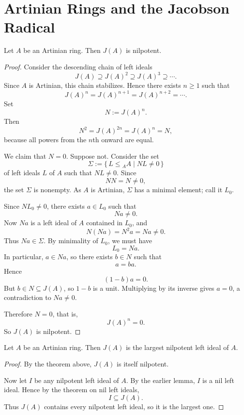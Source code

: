 \section{Artinian Rings and the Jacobson Radical}

\begin{theorem}
    Let $A$ be an Artinian ring. Then $J(A)$ is nilpotent.
\end{theorem}

\begin{proof}
    Consider the descending chain of left ideals
    \[
        J(A)\supseteq J(A)^2\supseteq J(A)^3\supseteq \cdots.
    \]
    Since $A$ is Artinian, this chain stabilizes. Hence there exists $n\ge 1$ such that
    \[
        J(A)^n=J(A)^{n+1}=J(A)^{n+2}=\cdots.
    \]
    Set
    \[
        N:=J(A)^n.
    \]
    Then
    \[
        N^2=J(A)^{2n}=J(A)^n=N,
    \]
    because all powers from the $n$th onward are equal.

    We claim that $N=0$. Suppose not. Consider the set
    \[
        \Sigma:=\{\,L\leq {}_AA \mid NL\neq 0\,\}
    \]
    of left ideals $L$ of $A$ such that $NL\neq 0$. Since
    \[
        NN=N\neq 0,
    \]
    the set $\Sigma$ is nonempty. As $A$ is Artinian, $\Sigma$ has a minimal element; call it $L_0$.

    Since $NL_0\neq 0$, there exists $a\in L_0$ such that
    \[
        Na\neq 0.
    \]
    Now $Na$ is a left ideal of $A$ contained in $L_0$, and
    \[
        N(Na)=N^2a=Na\neq 0.
    \]
    Thus $Na\in \Sigma$. By minimality of $L_0$, we must have
    \[
        L_0=Na.
    \]
    In particular, $a\in Na$, so there exists $b\in N$ such that
    \[
        a=ba.
    \]
    Hence
    \[
        (1-b)a=0.
    \]
    But $b\in N\subseteq J(A)$, so $1-b$ is a unit. Multiplying by its inverse gives $a=0$, a contradiction
    to $Na\neq 0$.

    Therefore $N=0$, that is,
    \[
        J(A)^n=0.
    \]
    So $J(A)$ is nilpotent.
\end{proof}

\begin{corollary}
    Let $A$ be an Artinian ring. Then $J(A)$ is the largest nilpotent left ideal of $A$.
\end{corollary}

\begin{proof}
    By the theorem above, $J(A)$ is itself nilpotent.

    Now let $I$ be any nilpotent left ideal of $A$. By the earlier lemma, $I$ is a nil left ideal.
    Hence by the theorem on nil left ideals,
    \[
        I\subseteq J(A).
    \]
    Thus $J(A)$ contains every nilpotent left ideal, so it is the largest one.
\end{proof}

